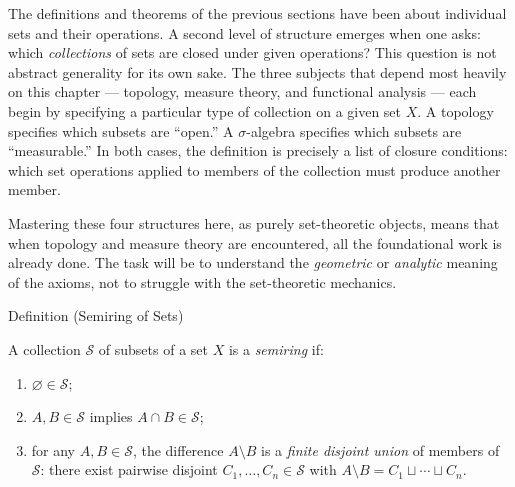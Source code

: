 \begin{exposition}
The definitions and theorems of the previous sections have been about
individual sets and their operations. A second level of structure emerges
when one asks: which \emph{collections} of sets are closed under given
operations? This question is not abstract generality for its own sake. The
three subjects that depend most heavily on this chapter --- topology, measure
theory, and functional analysis --- each begin by specifying a particular type
of collection on a given set $X$. A topology specifies which subsets are
``open.'' A $\sigma$-algebra specifies which subsets are ``measurable.'' In
both cases, the definition is precisely a list of closure conditions: which
set operations applied to members of the collection must produce another
member.
\end{exposition}

\begin{exposition}
Mastering these four structures here, as purely set-theoretic objects, means
that when topology and measure theory are encountered, all the foundational
work is already done. The task will be to understand the \emph{geometric} or
\emph{analytic} meaning of the axioms, not to struggle with the set-theoretic
mechanics.
\end{exposition}


\begin{definitionbox}{Definition (Semiring of Sets)}
\begin{definition}\label{def:semiring-of-sets}
A collection $\mathcal{S}$ of subsets of a set $X$ is a \emph{semiring} if:
\begin{enumerate}[label=(\roman*)]
\item $\varnothing \in \mathcal{S}$;
\item $A, B \in \mathcal{S}$ implies $A \cap B \in \mathcal{S}$;
\item for any $A, B \in \mathcal{S}$, the difference $A \setminus B$ is a
  \emph{finite disjoint union} of members of $\mathcal{S}$: there exist
  pairwise disjoint $C_1, \dots, C_n \in \mathcal{S}$ with
  $A \setminus B = C_1 \sqcup \cdots \sqcup C_n$.
\end{enumerate}
\end{definition}
\end{definitionbox}

